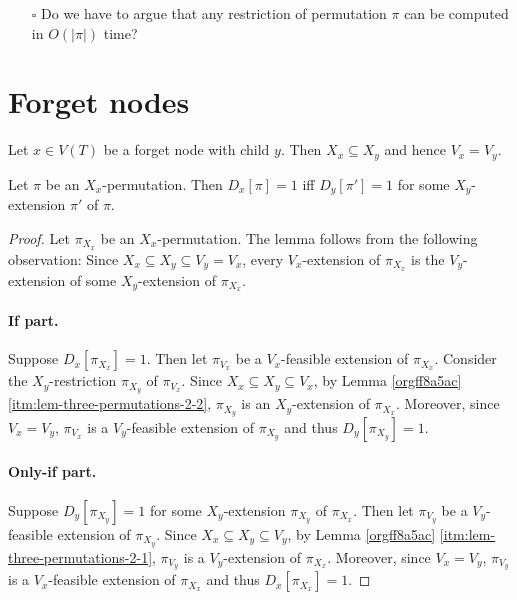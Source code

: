 \documentclass[fontsize=11pt,paper=a4]{book}
\begin{document}
\begin{itemize}
\item[{$\square$}] Do we have to argue that any restriction of permutation \(\pi\) can be computed in \(O(\lvert\pi\rvert)\) time?
\end{itemize}

\section{Forget nodes}
\label{sec:orgf59f6de}

Let \(x\in V(T)\) be a forget node with child \(y\). Then \(X_x\subseteq X_y\) and hence \(V_x=V_y\).

\begin{lem}
Let \(\pi\) be an \(X_x\)-permutation. Then \(D_x[\pi]=1\) iff \(D_y[\pi']=1\) for some \(X_y\)-extension \(\pi'\) of \(\pi\).
\label{org68cbdd9}
\end{lem}

\begin{proof}
Let \(\pi_{X_x}\) be an \(X_x\)-permutation.
The lemma follows from the following observation:
Since \(X_x\subseteq X_y\subseteq V_y=V_x\), every \(V_x\)-extension of \(\pi_{X_x}\) is the \(V_y\)-extension of some \(X_y\)-extension of \(\pi_{X_x}\).

\paragraph{If part.}
Suppose \(D_x[\pi_{X_x}]=1\).
Then let \(\pi_{V_x}\) be a \(V_x\)-feasible extension of \(\pi_{X_x}\).
Consider the \(X_y\)-restriction \(\pi_{X_y}\) of \(\pi_{V_x}\).
Since \(X_x\subseteq X_y\subseteq V_x\), by Lemma \ref{orgff8a5ac} \ref{itm:lem-three-permutations-2-2}, \(\pi_{X_y}\) is an \(X_y\)-extension of \(\pi_{X_x}\).
Moreover, since \(V_x=V_y\), \(\pi_{V_x}\) is a \(V_y\)-feasible extension of \(\pi_{X_y}\) and thus \(D_y[\pi_{X_y}]=1\).

\paragraph{Only-if part.}
Suppose \(D_y[\pi_{X_y}]=1\) for some \(X_y\)-extension \(\pi_{X_y}\) of \(\pi_{X_x}\).
Then let \(\pi_{V_y}\) be a \(V_y\)-feasible extension of \(\pi_{X_y}\).
Since \(X_x\subseteq X_y\subseteq V_y\), by Lemma \ref{orgff8a5ac} \ref{itm:lem-three-permutations-2-1}, \(\pi_{V_y}\) is a \(V_y\)-extension of \(\pi_{X_x}\).
Moreover, since \(V_x=V_y\), \(\pi_{V_y}\) is a \(V_x\)-feasible extension of \(\pi_{X_x}\) and thus \(D_x[\pi_{X_x}]=1\).
\end{proof}
\end{document}
